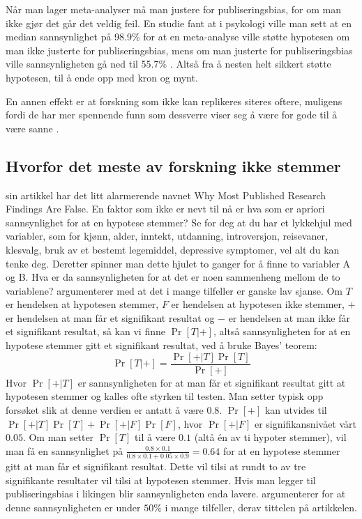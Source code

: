 \documentclass[doc,norsk]{apa7}
\begin{document}
Når man lager meta-analyser må man justere for publiseringsbias, for om man ikke gjør det går det veldig feil. En studie fant at i psykologi ville man sett at en median sannsynlighet på 98.9\% for at en meta-analyse ville støtte hypotesen om man ikke justerte for publiseringsbias, mens om man justerte for publiseringsbias ville sannsynligheten gå ned til 55.7\% \parencite{publiseringsbias-psykologi}. Altså fra å nesten helt sikkert støtte hypotesen, til å ende opp med kron og mynt.

En annen effekt er at forskning som ikke kan replikeres siteres oftere, muligens fordi de har mer spennende funn som dessverre viser seg å være for gode til å være sanne \parencite{falsk-sitert-mer}.

\subsection{Hvorfor det meste av forskning ikke stemmer}
\textcite{forskning-fake} sin artikkel har det litt alarmerende navnet \guillemetleft Why Most Published Research Findings Are False\guillemetright. En faktor som ikke er nevt til nå er hva som er apriori sannsynlighet for at en hypotese stemmer? Se for deg at du har et lykkehjul med variabler, som for kjønn, alder, inntekt, utdanning, introversjon, reisevaner, klesvalg, bruk av et bestemt legemiddel, depressive symptomer, vel alt du kan tenke deg. Deretter spinner man dette hjulet to ganger for å finne to variabler A og B. Hva er da sannsynligheten for at det er noen sammenheng mellom de to variablene? \textcite{forskning-fake} argumenterer med at det i mange tilfeller er ganske lav sjanse.
Om $T$ er hendelsen at hypotesen stemmer, $F$ er hendelsen at hypotesen ikke stemmer, $+$ er hendelsen at man får et signifikant resultat og $-$ er hendelsen at man ikke får et signifikant resultat, så kan vi finne $\Pr[T|+]$, altså sannsynligheten for at en hypotese stemmer gitt et signifikant resultat, ved å bruke Bayes' teorem:
\begin{equation*}
\Pr[T|+] = \frac{\Pr[+|T]\Pr[T]}{\Pr[+]}
\end{equation*}
Hvor $\Pr[+|T]$ er sannsynligheten for at man får et signifikant resultat gitt at hypotesen stemmer og kalles ofte styrken til testen. Man setter typisk opp forsøket slik at denne verdien er antatt å være $0.8$. $\Pr[+]$ kan utvides til $\Pr[+|T]\Pr[T] + \Pr[+|F]\Pr[F]$, hvor $\Pr[+|F]$ er signifikansnivået vårt $0.05$. Om man setter $\Pr[T]$ til å være $0.1$ (altå én av ti hypoter stemmer), vil man få en sannsynlighet på $\frac{0.8\times 0.1}{0.8\times 0.1 + 0.05\times 0.9} = 0.64$ for at en hypotese stemmer gitt at man får et signifikant resultat. Dette vil tilsi at rundt to av tre signifikante resultater vil tilsi at hypotesen stemmer. Hvis man legger til publiseringsbias i likingen blir sannsynligheten enda lavere. \textcite{forskning-fake} argumenterer for at denne sannsynligheten er under $50\%$ i mange tilfeller, derav tittelen på artikkelen.
\end{document}
